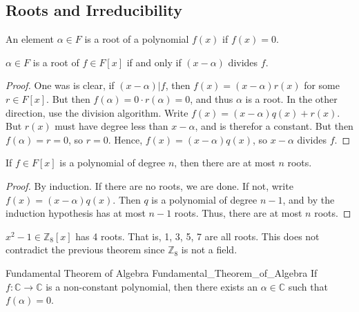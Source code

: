 \documentclass{article}                                                        %
\begin{document}
        \subsection{Roots and Irreducibility}
            \begin{definition}
                An element $\alpha\in{F}$ is a root of a polynomial $f(x)$ if
                $f(x)=0$.
            \end{definition}
            \begin{theorem}
                $\alpha\in{F}$ is a root of $f\in{F}[x]$ if and only if
                $(x-\alpha)$ divides $f$.
            \end{theorem}
            \begin{proof}
                One was is clear, if $(x-\alpha)|f$, then $f(x)=(x-\alpha)r(x)$
                for some $r\in{F}[x]$. But then $f(\alpha)=0\cdot{r}(\alpha)=0$,
                and thus $\alpha$ is a root. In the other direction, use the
                division algorithm. Write $f(x)=(x-\alpha)q(x)+r(x)$. But $r(x)$
                must have degree less than $x-\alpha$, and is therefor a
                constant. But then $f(\alpha)=r=0$, so $r=0$. Hence,
                $f(x)=(x-\alpha)q(x)$, so $x-\alpha$ divides $f$.
            \end{proof}
            \begin{theorem}
                If $f\in{F}[x]$ is a polynomial of degree $n$, then there are at
                most $n$ roots.
            \end{theorem}
            \begin{proof}
                By induction. If there are no roots, we are done. If not, write
                $f(x)=(x-\alpha)q(x)$. Then $q$ is a polynomial of degree $n-1$,
                and by the induction hypothesis has at most $n-1$ roots. Thus,
                there are at most $n$ roots.
            \end{proof}
            \begin{example}
                $x^{2}-1\in\mathbb{Z}_{8}[x]$ has 4 roots. That is, 1, 3, 5, 7
                are all roots. This does not contradict the previous theorem
                since $\mathbb{Z}_{8}$ is not a field.
            \end{example}
            \begin{ftheorem}{Fundamental Theorem of Algebra}
                            {Fundamental_Theorem_of_Algebra}
                If $f:\mathbb{C}\rightarrow\mathbb{C}$ is a non-constant
                polynomial, then there exists an $\alpha\in\mathbb{C}$ such that
                $f(\alpha)=0$.
            \end{ftheorem}
\end{document}
